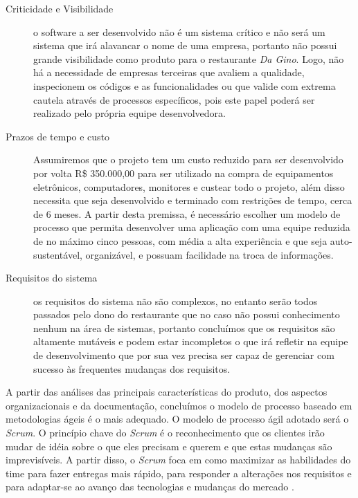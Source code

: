 \begin{description}
  \item [Criticidade e Visibilidade] o software a ser desenvolvido não é um sistema crítico e não será um sistema que irá alavancar o nome de uma empresa, portanto não possui grande visibilidade como produto para o restaurante \textit{Da Gino}. Logo, não há a necessidade de empresas terceiras que avaliem a qualidade, inspecionem os códigos e as funcionalidades ou que valide com extrema cautela através de processos específicos, pois este papel poderá ser realizado pelo própria equipe desenvolvedora.
  \item [Prazos de tempo e custo] Assumiremos que o projeto tem um custo reduzido para ser desenvolvido por volta R\$ 350.000,00 para ser utilizado na compra de equipamentos eletrônicos, computadores, monitores e custear todo o projeto, além disso necessita que seja desenvolvido e terminado com restrições de tempo, cerca de 6 meses. A partir desta premissa, é necessário escolher um modelo de processo que permita desenvolver uma aplicação com uma equipe reduzida de no máximo cinco pessoas, com média a alta experiência e que seja auto-sustentável, organizável, e possuam facilidade na troca de informações.

  \item [Requisitos do sistema] os requisitos do sistema não são complexos, no entanto serão todos passados pelo dono do restaurante que no caso não possui conhecimento nenhum na área de sistemas, portanto concluímos que os requisitos são altamente mutáveis e podem estar incompletos o que irá refletir na equipe de desenvolvimento que por sua vez precisa ser capaz de gerenciar com sucesso às frequentes mudanças dos requisitos.
\end{description}

A partir das análises das principais características do produto, dos aspectos organizacionais e da documentação, concluímos o modelo de processo baseado em metodologias ágeis é o mais adequado. O modelo de processo ágil adotado será o \textit{Scrum}. O princípio chave do \textit{Scrum} é o reconhecimento que os clientes irão mudar de idéia sobre o que eles precisam e querem e que estas mudanças são imprevisíveis. A partir disso, o \textit{Scrum} foca em como maximizar as habilidades do time para fazer entregas mais rápido, para responder a alterações nos requisitos e para adaptar-se ao avanço das tecnologias e mudanças do mercado \cite{scrumwiki:17}.


